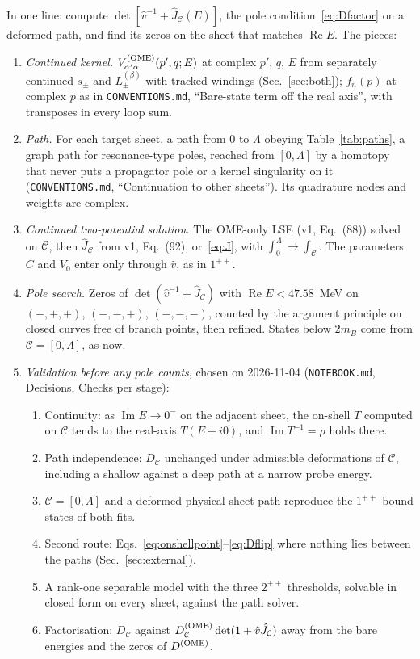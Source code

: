 \documentclass[11pt]{article}
\newcommand{\file}[1]{\nolinkurl{#1}}
\begin{document}
In one line: compute $\det[\hat v^{-1}+\hat J_{\mathcal C}(E)]$, the pole condition~\eqref{eq:Dfactor} on a deformed path, and find its zeros on the sheet that matches $\operatorname{Re}E$. The pieces:
\begin{enumerate}
\item \emph{Continued kernel.} $V^{\rm(OME)}_{\alpha'\alpha}(p',q;E)$ at complex $p'$, $q$, $E$ from separately continued $s_\pm$ and $L^{(\beta)}_\pm$ with tracked windings (Sec.~\ref{sec:both}); $f_n(p)$ at complex $p$ as in \file{CONVENTIONS.md}, ``Bare-state term off the real axis'', with transposes in every loop sum.
\item \emph{Path.} For each target sheet, a path from $0$ to $\Lambda$ obeying Table~\ref{tab:paths}, a graph path for resonance-type poles, reached from $[0,\Lambda]$ by a homotopy that never puts a propagator pole or a kernel singularity on it (\file{CONVENTIONS.md}, ``Continuation to other sheets''). Its quadrature nodes and weights are complex.
\item \emph{Continued two-potential solution.} The OME-only LSE (v1, Eq.~(88)) solved on $\mathcal C$, then $\hat J_{\mathcal C}$ from v1, Eq.~(92), or~\eqref{eq:J}, with $\int_0^\Lambda\to\int_{\mathcal C}$. The parameters $C$ and $V_0$ enter only through $\hat v$, as in $1^{++}$.
\item \emph{Pole search.} Zeros of $\det(\hat v^{-1}+\hat J_{\mathcal C})$ with $\operatorname{Re}E<47.58$~MeV on $(-,+,+)$, $(-,-,+)$, $(-,-,-)$, counted by the argument principle on closed curves free of branch points, then refined. States below $2m_B$ come from $\mathcal C=[0,\Lambda]$, as now.
\item \emph{Validation before any pole counts}, chosen on 2026-11-04 (\file{NOTEBOOK.md}, Decisions, Checks per stage):
\begin{enumerate}
\item Continuity: as $\operatorname{Im}E\to0^-$ on the adjacent sheet, the on-shell $T$ computed on $\mathcal C$ tends to the real-axis $T(E+i0)$, and $\operatorname{Im}T^{-1}=\rho$ holds there.
\item Path independence: $D_{\mathcal C}$ unchanged under admissible deformations of $\mathcal C$, including a shallow against a deep path at a narrow probe energy.
\item $\mathcal C=[0,\Lambda]$ and a deformed physical-sheet path reproduce the $1^{++}$ bound states of both fits.
\item Second route: Eqs.~\eqref{eq:onshellpoint}--\eqref{eq:Dflip} where nothing lies between the paths (Sec.~\ref{sec:external}).
\item A rank-one separable model with the three $2^{++}$ thresholds, solvable in closed form on every sheet, against the path solver.
\item Factorisation: $D_{\mathcal C}$ against $D^{\rm(OME)}_{\mathcal C}\det(1+\hat v\hat J_{\mathcal C})$ away from the bare energies and the zeros of $D^{\rm(OME)}$.
\end{enumerate}
\end{enumerate}
\end{document}
